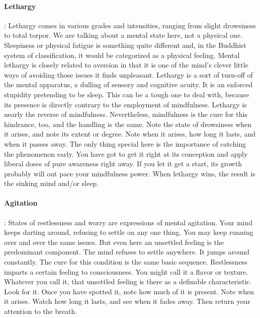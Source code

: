 \paragraph*{Lethargy}: Lethargy comes in various grades and intensities, ranging from slight
drowsiness to total torpor. We are talking about a mental state here, not a
physical one. Sleepiness or physical fatigue is something quite different and,
in the Buddhist system of classification, it would be categorized as a physical
feeling. Mental lethargy is closely related to aversion in that it is one of the
mind's clever little ways of avoiding those issues it finds unpleasant. Lethargy
is a sort of turn-off of the mental apparatus, a dulling of sensory and
cognitive acuity. It is an enforced stupidity pretending to be sleep. This can
be a tough one to deal with, because its presence is directly contrary to the
employment of mindfulness. Lethargy is nearly the reverse of mindfulness.
Nevertheless, mindfulness is the cure for this hindrance, too, and the handling
is the same. Note the state of drowsiness when it arises, and note its extent or
degree. Note when it arises, how long it lasts, and when it passes away. The
only thing special here is the importance of catching the phenomenon early. You
have got to get it right at its conception and apply liberal doses of pure
awareness right away. If you let it get a start, its growth probably will out
pace your mindfulness power. When lethargy wins, the result is the sinking mind
and/or sleep.

\paragraph*{Agitation}: States of restlessness and worry are expressions of mental agitation.
Your mind keeps darting around, refusing to settle on any one thing. You may
keep running over and over the same issues. But even here an unsettled feeling
is the predominant component. The mind refuses to settle anywhere. It jumps
around constantly. The cure for this condition is the same basic sequence.
Restlessness imparts a certain feeling to consciousness. You might call it a
flavor or texture. Whatever you call it, that unsettled feeling is there as a
definable characteristic. Look for it. Once you have spotted it, note how much
of it is present. Note when it arises. Watch how long it lasts, and see when it
fades away. Then return your attention to the breath.


